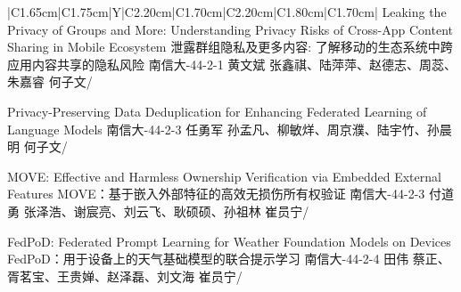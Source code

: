 \Needspace{7.5cm}
\begin{tabularx}{\textwidth}{|C{1.65cm}|C{1.75cm}|Y|C{2.20cm}|C{1.70cm}|C{2.20cm}|C{1.80cm}|C{1.70cm}|}
\HeaderRow
{}
{Leaking the Privacy of Groups and More: Understanding Privacy Risks of Cross-App Content  Sharing in Mobile Ecosystem \newline 泄露群组隐私及更多内容: 了解移动的生态系统中跨应用内容共享的隐私风险}
{南信大-44-2-1}
{黄文斌}
{张鑫祺、陆萍萍、赵德志、周蕊、朱嘉睿}
{何子文}{/}


{Privacy-Preserving Data Deduplication for Enhancing Federated Learning of Language Models }
{南信大-44-2-3}
{任勇军}
{孙孟凡、柳敏烊、周京濮、陆宇竹、孙晨明}
{何子文}{/}




{MOVE: Effective and Harmless Ownership Verification via Embedded External Features   \newline MOVE：基于嵌入外部特征的高效无损伤所有权验证}
{南信大-44-2-3}
{付道勇}
{张泽浩、谢宸亮、刘云飞、耿硕硕、孙祖林}
{崔员宁}{/}

{FedPoD: Federated Prompt Learning for Weather Foundation Models on Devices \newline  FedPoD：用于设备上的天气基础模型的联合提示学习 }
{南信大-44-2-4}
{田伟}
{蔡正、胥茗宝、王贵婵、赵泽磊、刘文海}
{崔员宁}{/}
\end{tabularx}
\BlockGap



